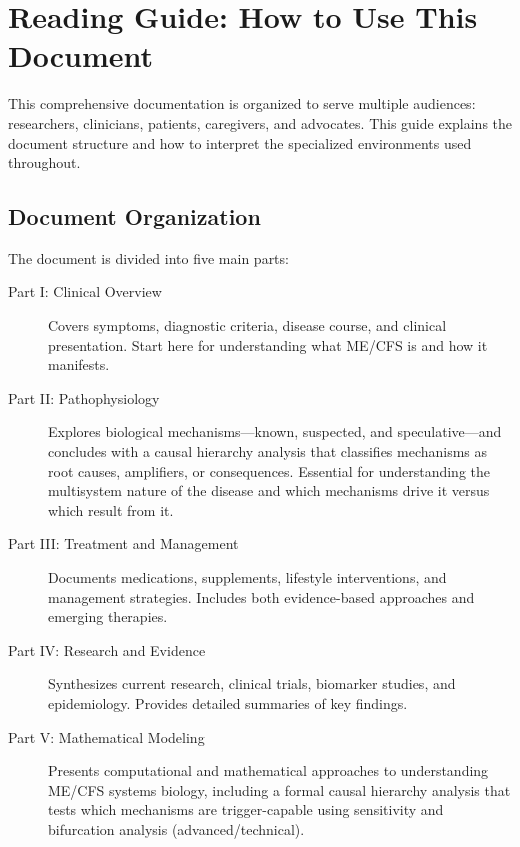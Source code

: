 \chapter*{Reading Guide: How to Use This Document}
\label{ch:reading-guide}

This comprehensive documentation is organized to serve multiple audiences: researchers, clinicians, patients, caregivers, and advocates. This guide explains the document structure and how to interpret the specialized environments used throughout.

\section*{Document Organization}

The document is divided into five main parts:

\begin{description}
\item[Part I: Clinical Overview] Covers symptoms, diagnostic criteria, disease course, and clinical presentation. Start here for understanding what ME/CFS is and how it manifests.

\item[Part II: Pathophysiology] Explores biological mechanisms---known, suspected, and speculative---and concludes with a causal hierarchy analysis that classifies mechanisms as root causes, amplifiers, or consequences. Essential for understanding the multisystem nature of the disease and which mechanisms drive it versus which result from it.

\item[Part III: Treatment and Management] Documents medications, supplements, lifestyle interventions, and management strategies. Includes both evidence-based approaches and emerging therapies.

\item[Part IV: Research and Evidence] Synthesizes current research, clinical trials, biomarker studies, and epidemiology. Provides detailed summaries of key findings.

\item[Part V: Mathematical Modeling] Presents computational and mathematical approaches to understanding ME/CFS systems biology, including a formal causal hierarchy analysis that tests which mechanisms are trigger-capable using sensitivity and bifurcation analysis (advanced/technical).
\end{description}

